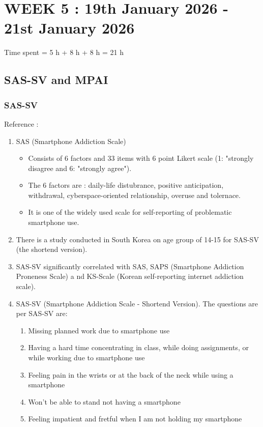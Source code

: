 \documentclass{article}
\begin{document}
\newpage
\section{WEEK 5 : 19th January 2026 - 21st January 2026}

Time spent = 5 h + 8 h + 8 h = 21 h

\subsection{SAS-SV and MPAI}
\subsubsection{SAS-SV} 
Reference : \cite{SAS_SV} \cite{SAS_SV_India}
\begin{enumerate}
    \item SAS (Smartphone Addiction Scale)
    \begin{itemize}
        \item Consists of 6 factors and 33 items with 6 point Likert scale (1: "strongly disagree and 6: "strongly agree").
        \item The 6 factors are : daily-life distubrance, positive anticipation, withdrawal, cyberspace-oriented relationship, overuse and tolernace. 
        \item It is one of the widely used scale for self-reporting of problematic smartphone use.
    \end{itemize}
    \item There is a study \cite{SAS_SV} conducted in South Korea on age group of 14-15 for SAS-SV (the shortend version). 
    \item SAS-SV significantly correlated with SAS, SAPS (Smartphone Addiction Proneness Scale) a
    nd KS-Scale (Korean self-reporting internet addiction scale). 
    \item SAS-SV (Smartphone Addiction Scale - Shortend Version). The questions are per SAS-SV are:
    \begin{enumerate}
        \item Missing planned work due to smartphone use
        \item Having a hard time concentrating in class, while doing assignments, or while working due to smartphone use
        \item Feeling pain in the wrists or at the back of the neck while using a smartphone
        \item Won't be able to stand not having a smartphone
        \item Feeling impatient and fretful when I am not holding my smartphone

\end{enumerate}
\end{enumerate}
\end{document}
